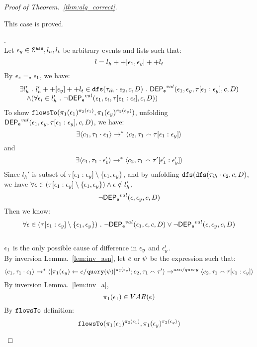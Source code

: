 \documentclass[a4paper,11pt]{article}
\begin{document}
\begin{proof}[Proof of Theorem.~\ref{thm:alg_correct}]
\begin{case}
\begin{subcase}
\begin{subsubcase}
\[\]
This case is proved.
%
\end{subsubcase}
%
\begin{subsubcase}.
\\
Let $\mathtt{\epsilon}_y \in \mathcal{E}^{\mathtt{{asn}}}, l_h, l_t$ be arbitrary events and lists such that:
\[
  l = l_h ++ [\mathtt{\epsilon}_1, \mathtt{\epsilon}_y] ++ l_t 
\]
%
By $\mathtt{\epsilon}_z =_{\mathtt{e}} \mathtt{\epsilon}_1$, we have:
\[
\begin{array}{l}
  \exists l_{h}' ~.~ l_{h}' ++ [\mathtt{\epsilon}_y] ++ l_t \in \mathtt{dfs}(\mathtt{\tau}_{ih}\cdot \mathtt{\epsilon}_2, c, D) ~.~
  \mathsf{DEP_{\mathtt{e}}}^{val}(\mathtt{\epsilon}_1, \mathtt{\epsilon}_y, \mathtt{\tau}[\mathtt{\epsilon}_1:\mathtt{\epsilon}_y], c, D)
  \\ \quad \land 
  (\forall \mathtt{\epsilon}_i \in l_{h}' ~.~ \neg \mathsf{DEP_{\mathtt{e}}}^{val} (\mathtt{\epsilon}_1, \mathtt{\epsilon}_i, \mathtt{\tau}[\mathtt{\epsilon}_1: \mathtt{\epsilon}_i], c, D))
\end{array}
\]
%
To show $\mathtt{flowsTo}(\pi_1(\mathtt{\epsilon}_1)^{\pi_2(\mathtt{\epsilon}_1)}, \pi_1(\mathtt{\epsilon}_y)^{\pi_2(\mathtt{\epsilon}_y)})$, unfolding $\mathsf{DEP_{\mathtt{e}}}^{val}(\mathtt{\epsilon}_1, \mathtt{\epsilon}_y, \mathtt{\tau}[\mathtt{\epsilon}_1:\mathtt{\epsilon}_y], c, D)$, we have:
\[
\exists \langle c_1, \mathtt{\tau}_1 \cdot \mathtt{\epsilon}_1 \rangle \rightarrow^{*} \langle c_2, \mathtt{\tau}_1 \smallfrown \mathtt{\tau}[\mathtt{\epsilon}_1:\mathtt{\epsilon}_y] \rangle 
\]
and 
\[
\exists \langle c_1, \mathtt{\tau}_1 \cdot \mathtt{\epsilon}_1' \rangle \rightarrow^{*} \langle c_2, \mathtt{\tau}_1 \smallfrown \mathtt{\tau}'[\mathtt{\epsilon}_1':\mathtt{\epsilon}_y'] \rangle 
\]
Since $l_{h}'$ is subset of $\mathtt{\tau}[\mathtt{\epsilon}_1:\mathtt{\epsilon}_y] \setminus \{\mathtt{\epsilon}_1, \mathtt{\epsilon}_y\}$, and 
%
 by unfolding $\mathtt{dfs}(\mathtt{dfs}(\mathtt{\tau}_{ih}\cdot \mathtt{\epsilon}_2, c, D) $, we have 
 $\forall \mathtt{\epsilon} \in (\mathtt{\tau}[\mathtt{\epsilon}_1:\mathtt{\epsilon}_y]\setminus \{\mathtt{\epsilon}_1, \mathtt{\epsilon}_y\}) 
 \land \mathtt{\epsilon} \notin l_h'$,
\[
  \neg \mathsf{DEP_{\mathtt{e}}}^{val} (\mathtt{\epsilon}, \mathtt{\epsilon}_y, c, D)
\]
%
Then we know:
\[
  \forall \mathtt{\epsilon} \in (\mathtt{\tau}[\mathtt{\epsilon}_1:\mathtt{\epsilon}_y]\setminus \{\mathtt{\epsilon}_1, \mathtt{\epsilon}_y\}) ~.~
  \neg \mathsf{DEP_{\mathtt{e}}}^{val} (\mathtt{\epsilon}_1, \mathtt{\epsilon}, c, D) \lor \neg \mathsf{DEP_{\mathtt{e}}}^{val} (\mathtt{\epsilon}, \mathtt{\epsilon}_y, c, D)
\]
\\
%
$\mathtt{\epsilon}_1$ is the only possible cause of difference in $\mathtt{\epsilon}_y$ and $\mathtt{\epsilon}_y'$.
%
\\
%
By inversion Lemma.~\ref{lem:inv_asn}, let $e$ or $\psi$ be the expression such that:
\[
\langle c_1, \mathtt{\tau}_1 \cdot \mathtt{\epsilon}_1 \rangle \rightarrow^{*} \langle [\mathrel{ \pi_1(\mathtt{\epsilon}_y) \leftarrow e / {\tt query}(\psi) }]{}^{\pi_2(\mathtt{\epsilon}_y)};c_2, \mathtt{\tau}_1 \smallfrown \mathtt{\tau}' \rangle \rightarrow^{asn / query} \langle c_2, \mathtt{\tau}_1 \smallfrown \mathtt{\tau}[\mathtt{\epsilon}_1:\mathtt{\epsilon}_y] \rangle 
\]
By inversion Lemma.~\ref{lem:inv_a}, 
\[
  \pi_1(\mathtt{\epsilon}_1) \in VAR(e)
\]
%
By $\mathtt{flowsTo}$ definition:
\[
  \mathtt{flowsTo}(\pi_1(\mathtt{\epsilon}_1)^{\pi_2(\mathtt{\epsilon}_1)}, \pi_1(\mathtt{\epsilon}_y)^{\pi_2(\mathtt{\epsilon}_y)})
\]
%
\end{subsubcase}

\end{subcase}
\end{case}
\end{proof}
\end{document}

